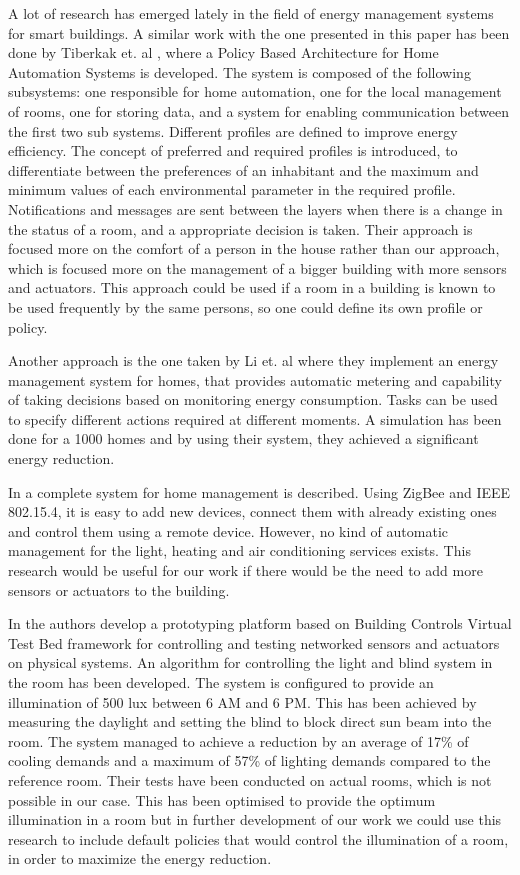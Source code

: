 \label{chap:relatedwork}
A lot of research has emerged lately in the field of energy management systems for smart buildings. 
A similar work with the one presented in this paper has been done by Tiberkak et. al \cite{Tiberkak10}, where a Policy Based Architecture for Home Automation
Systems is developed. The system is composed of the following subsystems: one responsible
for home automation, one for the local management of rooms, one for storing data, and a system for enabling communication between the first two sub systems. Different profiles are defined to improve energy efficiency.
The concept of preferred and required profiles is introduced, to differentiate between the preferences of an inhabitant and the maximum and minimum values of each environmental parameter in the required profile. Notifications and messages are sent between the layers when there is a change in the status of a room, and a appropriate decision is taken. Their approach is focused more on the comfort of a person in the house rather than our approach, which is focused more on the management of a bigger building with more sensors and actuators. This approach could be used if a room in a building is known to be used frequently by the same persons, so one could define its own profile or policy. 

Another approach is the one taken by Li et. al \cite{Li11} where they implement an energy management system for homes, that provides automatic metering and capability of taking decisions based on monitoring energy consumption. 
Tasks can be used to specify different actions required at different moments. A simulation has been done for a 1000 homes and by using their system, they achieved a significant energy reduction.

In \cite{Han10} a complete system for home management is described. Using ZigBee and IEEE 802.15.4, it is easy to add new devices, connect them with already existing ones and control them using a remote device. However, no kind of automatic management for the light, heating and air conditioning services exists. This research would be useful for our work if there would be the need to add more sensors or actuators to the building.

In \cite{Wen11} the authors develop a prototyping platform based on Building Controls Virtual Test Bed framework \cite{Bcvtb} for controlling and testing networked sensors and actuators on physical systems. An algorithm for controlling the light and blind system in the room has been developed. The system is configured to provide an illumination of 500 lux between 6 AM and 6 PM. This has been achieved by measuring the daylight and setting the blind to block direct sun beam into the room. The system managed to achieve a reduction by an average of 17\% of cooling demands and a maximum of 57\% of lighting demands compared to the reference room. Their tests have been conducted on actual rooms, which is not possible in our case. This has been optimised to provide the optimum illumination in a room but in further development of our work we could use this research to include default policies that would control the illumination of a room, in order to maximize the energy reduction. 

